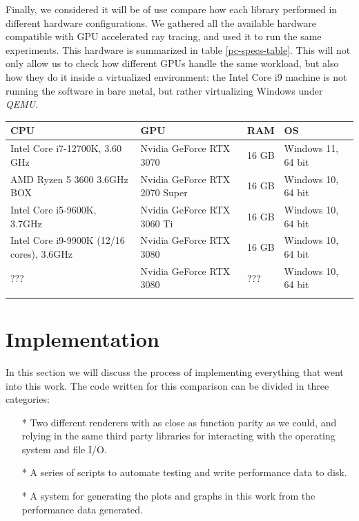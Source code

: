Finally, we considered it will be of use compare how each library performed in different hardware configurations. We gathered all the available hardware compatible with GPU accelerated ray tracing, and used it to run the same experiments. This hardware is summarized in table \ref{pc-specs-table}. This will not only allow us to check how different GPUs handle the same workload, but also how they do it inside a virtualized environment: the Intel Core i9 machine is not running the software in bare metal, but rather virtualizing Windows under \textit{QEMU}.

\begin{center}
  \begin{tabular}{ | m{5cm} | m{3.5cm}| m{2cm}|m{4cm} |}
  \hline
  CPU& GPU& RAM& OS\\
  \hline
    Intel Core i7-12700K, 3.60 GHz& Nvidia GeForce RTX 3070& 16 GB& Windows 11, 64 bit\\ %
  \hline
    AMD Ryzen 5 3600 3.6GHz BOX& Nvidia GeForce RTX 2070 Super& 16 GB& Windows 10, 64 bit\\
  \hline
    Intel Core i5-9600K, 3.7GHz& Nvidia GeForce RTX 3060 Ti& 16 GB& Windows 10, 64 bit\\ %
  \hline
    Intel Core i9-9900K (12/16 cores), 3.6GHz& Nvidia GeForce RTX 3080& 16 GB& Windows 10, 64 bit\\ %
  \hline
    ???& Nvidia GeForce RTX 3080& ???& Windows 10, 64 bit\\ %
  \label{pc-specs-table}
\end{tabular}
\end{center}

\clearpage


\section{Implementation}
In this section we will discuss the process of implementing everything that went into this work. The code written for this comparison can be divided in three categories:

\begin{itemize}
    \item[*]{Two different renderers with as close as function parity as we could, and relying in the same third party libraries for interacting with the operating system and file I/O.}
    \item[*]{A series of scripts to automate testing and write performance data to disk.}
    \item[*]{A system for generating the plots and graphs in this work from the performance data generated.}
\end{itemize}

